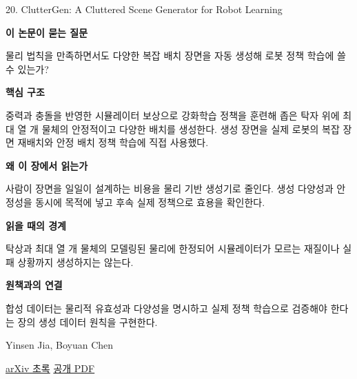 \documentclass[11pt,openany]{book}
\begin{document}
\begin{termcard}{20. ClutterGen: A Cluttered Scene Generator for Robot Learning}

\par

\medskip

{\sffamily\bfseries\color{deepblue} 이 논문이 묻는 질문}\par

물리 법칙을 만족하면서도 다양한 복잡 배치 장면을 자동 생성해 로봇 정책 학습에 쓸 수 있는가?

\smallskip

{\sffamily\bfseries\color{deepblue} 핵심 구조}\par

중력과 충돌을 반영한 시뮬레이터 보상으로 강화학습 정책을 훈련해 좁은 탁자 위에 최대 열 개 물체의 안정적이고 다양한 배치를 생성한다. 생성 장면을 실제 로봇의 복잡 장면 재배치와 안정 배치 정책 학습에 직접 사용했다.

\smallskip

{\sffamily\bfseries\color{deepblue} 왜 이 장에서 읽는가}\par

사람이 장면을 일일이 설계하는 비용을 물리 기반 생성기로 줄인다. 생성 다양성과 안정성을 동시에 목적에 넣고 후속 실제 정책으로 효용을 확인한다.

\smallskip

{\sffamily\bfseries\color{coral} 읽을 때의 경계}\par

탁상과 최대 열 개 물체의 모델링된 물리에 한정되어 시뮬레이터가 모르는 재질이나 실패 상황까지 생성하지는 않는다.

\smallskip

{\sffamily\bfseries\color{teal} 원책과의 연결}\par

합성 데이터는 물리적 유효성과 다양성을 명시하고 실제 정책 학습으로 검증해야 한다는 장의 생성 데이터 원칙을 구현한다.

\medskip

{\footnotesize\color{muted} Yinsen Jia, Boyuan Chen\par

\href{https://arxiv.org/abs/2407.05425}{arXiv 초록} \quad \href{https://arxiv.org/pdf/2407.05425}{공개 PDF}\par}

\end{termcard}
\end{document}
